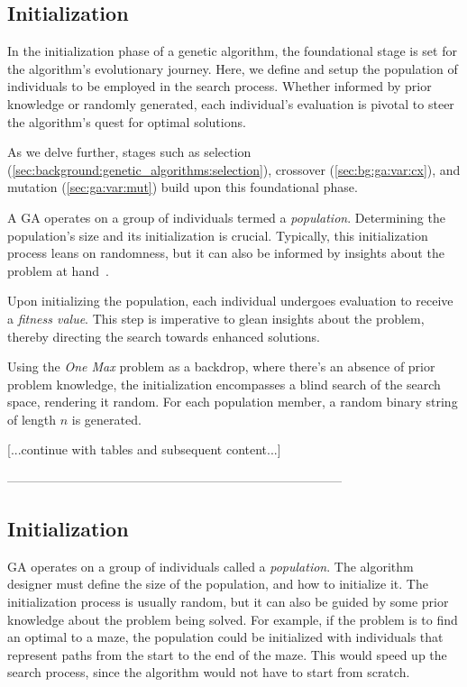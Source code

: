 \subsection{Initialization}
\label{sec:genetic_algorithms:initialization}

  In the initialization phase of a genetic algorithm, the foundational stage is 
  set for the algorithm's evolutionary journey.
  Here, we define and setup the population of individuals to be employed in the 
  search process.
  Whether informed by prior knowledge or randomly generated, each individual's evaluation is pivotal to steer the algorithm's quest for optimal solutions.

  As we delve further, stages such as selection 
  (\vref{sec:background:genetic_algorithms:selection}), crossover 
  (\vref{sec:bg:ga:var:cx}), and mutation (\vref{sec:ga:var:mut}) build upon 
  this foundational phase.

  A GA operates on a group of individuals termed a \emph{population}.
  Determining the population's size and its initialization is crucial.
  Typically, this initialization process leans on randomness, but it can also 
  be informed by insights about the problem at 
  hand~\autocite{dasguptaComparisonMultiobjectiveEvolutionary2008}.
  
  Upon initializing the population, each individual undergoes evaluation to receive a \emph{fitness value}.
  This step is imperative to glean insights about the problem, thereby directing the search towards enhanced solutions.

  Using the \emph{One Max} problem as a backdrop, where there's an absence of prior problem knowledge, the initialization encompasses a blind search of the search space, rendering it random.
  For each population member, a random binary string of length \(n\) is generated.

  [...continue with tables and subsequent content...]


--------------------------------------------------------------------------------

\subsection{Initialization}
\label{sec:genetic_algorithms:initialization}
  GA operates on a group of individuals called a \emph{population}.
  The algorithm designer must define the size of the population, and how to 
  initialize it.
  The initialization process is usually random, but it can also be guided by 
  some prior knowledge about the problem being solved.
  For example, if the problem is to find an optimal  to a maze, the population 
  could be initialized with individuals that represent paths from the start to 
  the end of the maze.
  This would speed up the search process, since the algorithm would not have to 
  start from scratch.

